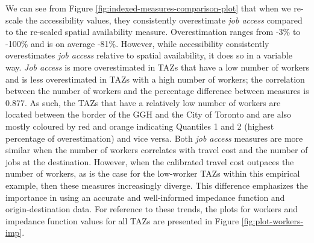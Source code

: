 \documentclass[]{elsarticle} %
\begin{document}
We can see from Figure \ref{fig:indexed-measures-comparison-plot} that
when we re-scale the accessibility values, they consistently
overestimate \emph{job access} compared to the re-scaled spatial
availability measure. Overestimation ranges from -3\% to -100\% and is
on average -81\%. However, while accessibility consistently
overestimates \emph{job access} relative to spatial availability, it
does so in a variable way. \emph{Job access} is more overestimated in
TAZs that have a low number of workers and is less overestimated in TAZs
with a high number of workers; the correlation between the number of
workers and the percentage difference between measures is 0.877. As
such, the TAZs that have a relatively low number of workers are located
between the border of the GGH and the City of Toronto and are also
mostly coloured by red and orange indicating Quantiles 1 and 2 (highest
percentage of overestimation) and vice versa. Both \emph{job access}
measures are more similar when the number of workers correlates with
travel cost and the number of jobs at the destination. However, when the
calibrated travel cost outpaces the number of workers, as is the case
for the low-worker TAZs within this empirical example, then these
measures increasingly diverge. This difference emphasizes the importance
in using an accurate and well-informed impedance function and
origin-destination data. For reference to these trends, the plots for
workers and impedance function values for all TAZs are presented in
Figure \ref{fig:plot-workers-imp}.
\end{document}
